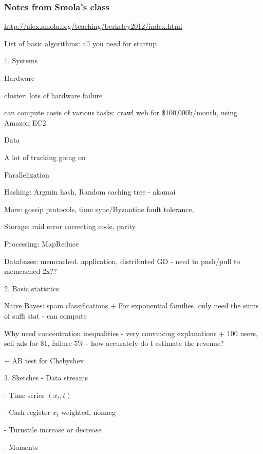 \documentclass[english]{article}
\begin{document}
\subsubsection{Notes from Smola's class}


\url{http://alex.smola.org/teaching/berkeley2012/index.html}

List of basic algorithms: all you need for startup

\benum 
\item  1. Systems
\benum 
\item   Hardware 
       
 cluster: lots of hardware failure

 can compute costs of various tasks: crawl web for \$100,000k/month, using Amazon EC2

\item   Data
 
A lot of tracking going on

\item  Parallelization

 Hashing: Argmin hash, Random caching tree - akamai

 More: gossip protocols, time sync/Byzantine fault tolerance, 
 
\item Storage: raid error correcting code, parity

\item Processing: MapReduce

\item Databases: memcached. application, distributed GD - need to push/pull to memcached 2x??
\eenum 


\item  2. Basic statistics
\benum
\item Naive Bayes: spam classifications
    + For exponential families, only need the sums of suffi stat - can compute
\item Why need concentration inequalities - very convincing explanations
    + 100 users, sell ads for \$1, failure 5\% - how accurately do I estimate the revenue?

    + AB test for Chebyshev
\eenum 

\item  3. Sketches - Data streams

- Time series $(x_t,t)$

- Cash register $x_t$ weighted, nonneg

- Turnstile increase or decrease

-  Moments
\end{document}
